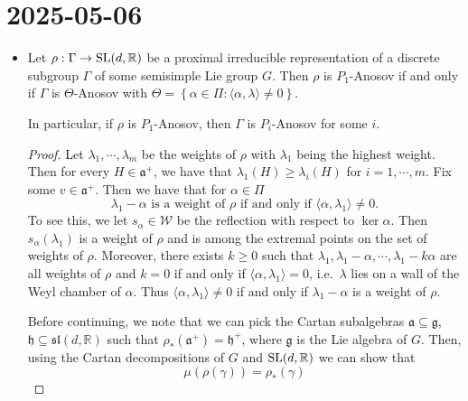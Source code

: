 \documentclass{report}
\begin{document}
\section{2025-05-06}
\begin{itemize}
    \item
    \begin{proposition}
        Let $\rho: \Gamma \to \operatorname{{\mathrm{SL}}}(d,\mathbb R)$ be a proximal irreducible representation of a discrete subgroup $\Gamma$ of some semisimple Lie group $G$.
        Then $\rho$ is $P_1$-Anosov if and only if $\Gamma$ is $\Theta$-Anosov with $\Theta = \left\{ \alpha \in \Pi: \langle \alpha, \lambda \rangle \neq 0 \right\}$.

        In particular, if $\rho$ is $P_1$-Anosov, then $\Gamma$ is $P_i$-Anosov for some $i$.
    \end{proposition}
    \begin{proof}
        Let $\lambda_1, \cdots, \lambda_m$ be the weights of $\rho$ with $\lambda_1$ being the highest weight.
        Then for every $H \in \mathfrak a^+$, we have that $\lambda_1(H) \geq \lambda_i(H)$ for $i = 1, \cdots, m$.
        Fix some $v \in \mathfrak a^+$.
        Then we have that for $\alpha \in \Pi$ 
        \[
        \lambda_1 - \alpha \text{ is a weight of } \rho \text{ if and only if } \langle \alpha, \lambda_1 \rangle \neq 0.
        \]
        To see this, we let $s_\alpha \in \mathcal W$ be the reflection with respect to $\ker \alpha$.
        Then $s_\alpha(\lambda_1)$ is a weight of $\rho$ and is among the extremal points on the set of weights of $\rho$.
        Moreover, there exists $k \geq 0$ such that $\lambda_1, \lambda_1 - \alpha, \cdots, \lambda_1 - k\alpha$ are all weights of $\rho$ and $k = 0$ if and only if $\langle \alpha, \lambda_1 \rangle = 0$, i.e.\ $\lambda$ lies on a wall of the Weyl chamber of $\alpha$.
        Thus $\langle \alpha, \lambda_1 \rangle \neq 0$ if and only if $\lambda_1 - \alpha$ is a weight of $\rho$.

        Before continuing, we note that we can pick the Cartan subalgebras $\mathfrak a \subseteq \mathfrak g$, $\mathfrak h \subseteq \mathfrak{sl}(d,\mathbb R)$ such that $\rho_*(\mathfrak a^+) = \mathfrak h^+$, where $\mathfrak g$ is the Lie algebra of $G$.
        Then, using the Cartan decompositions of $G$ and $\operatorname{{\mathrm{SL}}}(d,\mathbb R)$ we can show that
        \[
        \mu(\rho(\gamma)) = \rho_*(\gamma)
        \]


\end{proof}
\end{itemize}
\end{document}
